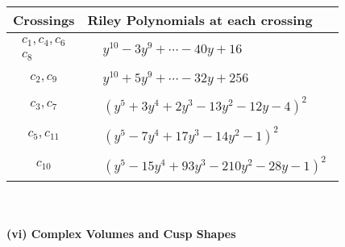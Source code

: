 \documentclass[1p]{elsarticle_modified}
\theoremstyle{definition}
\begin{document}
\begin{tabular}{m{50pt}|m{274pt}}
Crossings & \hspace{64pt}Riley Polynomials at each crossing \\
\hline $$\begin{aligned}c_{1},c_{4},c_{6}\\c_{8}\end{aligned}$$&$\begin{aligned}
&y^{10}-3 y^9+\cdots-40 y+16
\end{aligned}$\\
\hline $$\begin{aligned}c_{2},c_{9}\end{aligned}$$&$\begin{aligned}
&y^{10}+5 y^9+\cdots-32 y+256
\end{aligned}$\\
\hline $$\begin{aligned}c_{3},c_{7}\end{aligned}$$&$\begin{aligned}
&(y^5+3 y^4+2 y^3-13 y^2-12 y-4)^2
\end{aligned}$\\
\hline $$\begin{aligned}c_{5},c_{11}\end{aligned}$$&$\begin{aligned}
&(y^5-7 y^4+17 y^3-14 y^2-1)^2
\end{aligned}$\\
\hline $$\begin{aligned}c_{10}\end{aligned}$$&$\begin{aligned}
&(y^5-15 y^4+93 y^3-210 y^2-28 y-1)^2
\end{aligned}$\\
\hline
\end{tabular}\\~\\
\newpage\flushleft \textbf{(vi) Complex Volumes and Cusp Shapes}
\end{document}
